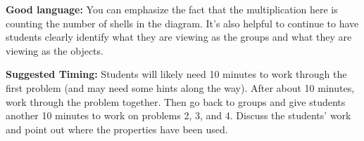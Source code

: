 \documentclass[nooutcomes, noauthor]{ximera}
\begin{document}
\begin{instructorNotes}
\begin{itemize}
\end{itemize}

{\bf Good language:}  You can emphasize the fact that the multiplication here is counting the number of shells in the diagram. It's also helpful to continue to have students clearly identify what they are viewing as the groups and what they are viewing as the objects.


{\bf Suggested Timing:} Students will likely need 10 minutes to work through the first problem (and may need some hints along the way). After about 10 minutes, work through the problem together. Then go back to groups and give students another 10 minutes to work on problems 2, 3, and 4. Discuss the students' work and point out where the properties have been used.
\end{instructorNotes}
\end{document}
